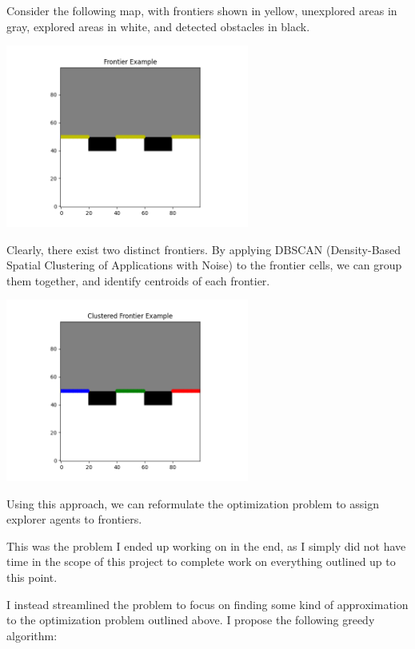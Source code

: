 \documentclass[conference]{IEEEtran}
\begin{document}
Consider the following map, with frontiers shown in yellow, unexplored areas in gray, explored areas in white, and 
detected obstacles in black.

\begin{center}
\includegraphics[width=8cm]{Images/frontier_example.png}
\end{center}

Clearly, there exist two distinct frontiers. By applying DBSCAN (Density-Based Spatial Clustering of Applications with Noise) to the frontier cells,
we can group them together, and identify centroids of each frontier.

\begin{center}
\includegraphics[width=8cm]{Images/clustered_frontier_example.png}
\end{center}

Using this approach, we can reformulate the optimization problem to assign explorer agents to frontiers. 

This was the problem I ended up working on in the end, as I simply did not have time
in the scope of this project to complete work on everything outlined up to this point.

I instead streamlined the problem to focus on finding some kind of approximation
to the optimization problem outlined above. I propose the following greedy algorithm:
\end{document}
